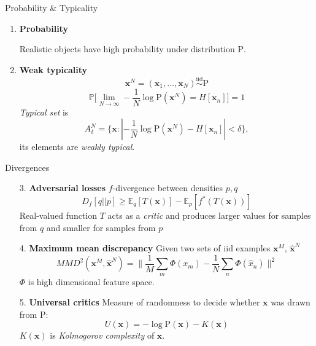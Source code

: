 \documentclass{beamer}
\begin{document}
\begin{frame}{Probability \& Typicality}

\begin{enumerate}
    \item \textbf{Probability}
    
    Realistic objects have high probability under distribution $\mathrm{P}$.

    \item \textbf{Weak typicality} \[\textbf{x}^N = (\textbf{x}_1, \dots, \textbf{x}_N) \overset{\mathrm{iid}}{\sim} \mathrm{P}\]
    \[\mathbb{P} \bigl[\lim\limits_{N \to \infty} -\dfrac1N \log \mathrm{P}(\textbf{x}^N) = H[\textbf{x}_n]\bigr] = 1\]
    \textit{Typical set} is \[A_\delta^N = \{\textbf{x}: | -\dfrac1N \log \mathrm{P}(\textbf{x}^N) - H[\textbf{x}_n]| < \delta \},\]
    its elements are \textit{weakly typical}.

\end{enumerate}

\end{frame}

\begin{frame}{Divergences}

\begin{enumerate}
    \item[3.] \textbf{Adversarial losses} $f$-divergence between densities $p, q$
    \[D_f [q || p] \ge \mathbb{E}_q [T(\textbf{x})] - \mathbb{E}_p [f^* (T(\textbf{x}))]\]
    Real-valued function $T$ acts as a \textit{critic} and produces larger values for samples from $q$ and smaller for samples from $p$
    \item[4.] \textbf{Maximum mean discrepancy
} Given two sets of $\mathrm{iid}$ examples $\textbf{x}^M$, $\mathbf{\hat{x}}^N$ \[MMD^2 (\textbf{x}^M, \mathbf{\hat{x}}^N) = \| \frac1M \sum\limits_m \Phi(x_m) - \frac1N \sum\limits_n \Phi(\hat{x}_n) \|^2 \]
$\Phi$ is high dimensional feature space.
    \item[5.] \textbf{Universal critics}
    Measure of randomness to decide whether $\textbf{x}$ was drawn from $\mathrm{P}$: \[U(\textbf{x}) = -\log \mathrm{P}(\textbf{x}) - K(\textbf{x})\]
    $K(\textbf{x})$ is \textit{Kolmogorov complexity} of $\textbf{x}$.

\end{enumerate}


\end{frame}
\end{document}
